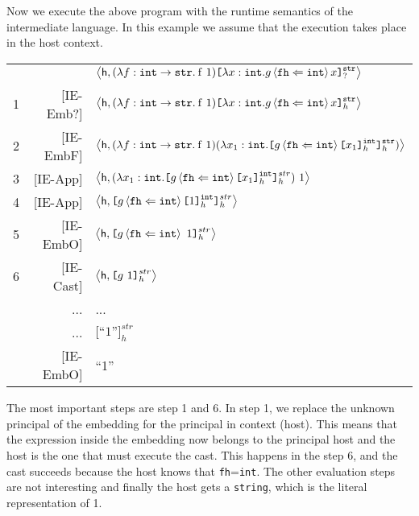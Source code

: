 \documentclass{article}
\newcommand{\emb}[3]{\texttt{[}#1\texttt{]}_{#2}^{#3}}
\newcommand{\tslam}[3]{\lambda #1 : #2. \: #3}
\newcommand{\eval}[2]{\left\langle {#1},{#2} \right\rangle}
\newcommand{\knows}[2]{\left\langle #1 \Leftarrow #2 \right\rangle}
\newcommand{\quotes}[1]{``#1''}
\newcommand\icode[1]{\texttt{#1}}
\newcommand\irname[1]{[#1]}
\begin{document}
Now we execute the above program with the runtime semantics of the intermediate language. In this example we assume that the execution takes place in the {\sf host} context.
\begin{center}
\begin{tabular}{r r l}
& & $\eval{{\sf h}}{(\tslam{f}{\icode{int} \rightarrow \icode{str}}{\mathrm{f~1}})\emb{\lambda x:\icode{int}.g \knows{\icode{fh}}{\icode{int}}x}{?}{\icode{str}}}$\\
1&\irname{IE-Emb?}& $\eval{{\sf h}}{(\tslam{f}{\icode{int} \rightarrow \icode{str}}{\mathrm{f~1}})
                   \emb{\lambda x:\icode{int}.g \knows{\icode{fh}}{\icode{int}}x}{h}{\icode{str}}}$\\
2&\irname{IE-EmbF}& $\eval{{\sf h}}{(\tslam{f}{\icode{int} \rightarrow \icode{str}}{\mathrm{f~1}})
                   (\lambda x_1:\icode{int}.\emb{g \knows{\icode{fh}}{\icode{int}}\emb{x_1}{h}{\icode{int}}}{h}{\icode{str}})}$\\
3&\irname{IE-App}  & $\eval{\sf h}{(\lambda x_1:\icode{int}.\emb{g \knows{\icode{fh}}{\icode{int}}\emb{x_1}{h}{\icode{int}}}{h}{str})~1}$\\
4&\irname{IE-App}  & $\eval{\sf h}{\emb{g \knows{\icode{fh}}{\icode{int}}\emb{1}{h}{\icode{int}}}{h}{str}}$ \\
5&\irname{IE-EmbO} & $\eval{\sf h}{\emb{g \knows{\icode{fh}}{\icode{int}}~1}{h}{str}}$ \\
6&\irname{IE-Cast} & $\eval{\sf h}{\emb{g~1}{h}{str}}$ \\
&... & ... \\
&... & $\emb{\text{\quotes{1}}}{h}{str}$ \\
&\irname{IE-EmbO}& \quotes{1} 
\end{tabular}
\end{center}

The most important steps are step 1 and 6. In step 1, we replace the unknown principal of the embedding for the principal in context ({\sf host}). This means that the expression inside the embedding now belongs to the principal {\sf host} and the {\sf host} is the one that must execute the cast. This happens in the step 6, and the cast succeeds because the {\sf host} knows that \icode{fh}=\icode{int}. The other evaluation steps are not interesting and finally the {\sf host} gets a \icode{string}, which is the literal representation of 1. 
\end{document}

